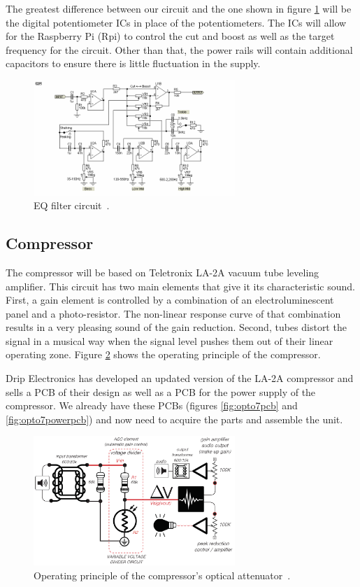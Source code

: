 \documentclass[journal]{IEEEtran}
\begin{document}
	The greatest difference between our circuit and the one shown in figure \ref{fig:eq} will be the digital potentiometer ICs in place of the potentiometers.  The ICs will allow for the Raspberry Pi (Rpi) to control the cut and boost as well as the target frequency for the circuit.  Other than that, the power rails will contain additional capacitors to ensure there is little fluctuation in the supply.
	
	
	
	\begin{figure}
		\centering
		\includegraphics[width=3in]{eq}
		\caption{EQ filter circuit~\cite{espEq}. }
		\label{fig:eq}
	\end{figure}
	
	\subsection{Compressor}
	The compressor will be based on Teletronix LA-2A vacuum tube leveling amplifier. This circuit has two main elements that give it its characteristic sound. First, a gain element is controlled by a combination of an electroluminescent panel and a photo-resistor. The non-linear response curve of that combination results in a very pleasing sound of the gain reduction.  Second, tubes distort the signal in a musical way when the signal level pushes them out of their linear operating zone. Figure \ref{fig:OpticalAttenuator} shows the operating principle of the compressor.
	
	Drip Electronics has developed an updated version of the LA-2A compressor and sells a PCB of their design as well as a PCB for the power supply of the compressor. We already have these PCBs (figures \ref{fig:opto7pcb} and \ref{fig:opto7powerpcb}) and now need to acquire the parts and assemble the unit.
	
	\begin{figure}
		\centering
		\includegraphics[width=3in]{OpticalAttenuator}
		\caption{Operating principle of the compressor's optical attenuator~\cite{opto7}. }
		\label{fig:OpticalAttenuator}
	\end{figure}
	
\end{document}
